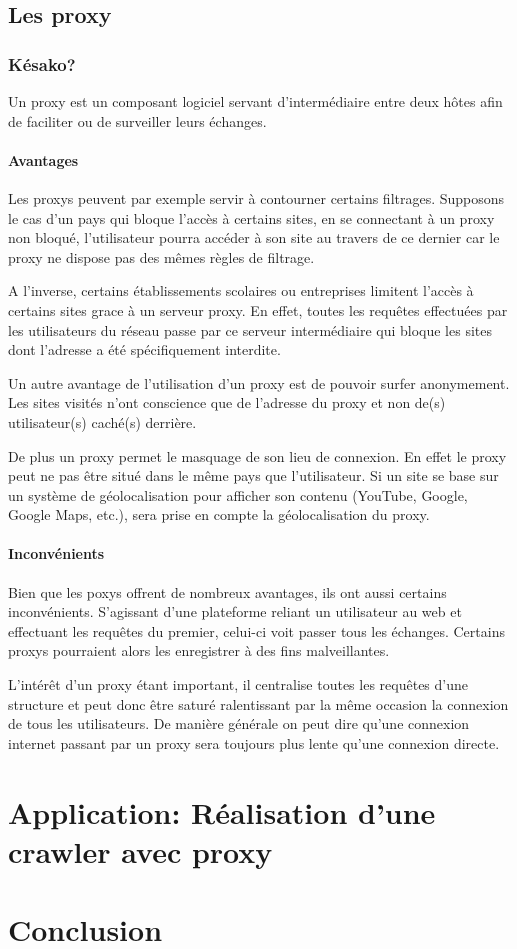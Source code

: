 \documentclass[hideweeklyreports,noposter]{polytech/polytech}
\begin{document}
	\chapter{Les proxy}
		\section{Késako?}
			Un proxy est un composant logiciel servant d'intermédiaire entre deux hôtes afin de faciliter ou de surveiller leurs échanges.
			
			\subsection{Avantages}
				Les proxys peuvent par exemple servir à contourner certains filtrages.
				Supposons le cas d'un pays qui bloque l'accès à certains sites, en se connectant à un proxy non bloqué, l'utilisateur pourra accéder à son site au travers de ce dernier car le proxy ne dispose pas des mêmes règles de filtrage.
				
				A l'inverse, certains établissements scolaires ou entreprises limitent l'accès à certains sites grace à un serveur proxy. En effet, toutes les requêtes effectuées par les utilisateurs du réseau passe par ce serveur intermédiaire qui bloque les sites dont l'adresse a été spécifiquement interdite.
				
				Un autre avantage de l'utilisation d'un proxy est de pouvoir surfer anonymement. Les sites visités n'ont conscience que de l'adresse du proxy et non de(s) utilisateur(s) caché(s) derrière.
				
				De plus un proxy permet le masquage de son lieu de connexion. En effet le proxy peut ne pas être situé dans le même pays que l'utilisateur.
				Si un site se base sur un système de géolocalisation pour afficher son contenu (YouTube, Google, Google Maps, etc.), sera prise en compte la géolocalisation du proxy.
				
			\subsection{Inconvénients}
				Bien que les poxys offrent de nombreux avantages, ils ont aussi certains inconvénients.
				S'agissant d'une plateforme reliant un utilisateur au web et effectuant les requêtes du premier, celui-ci voit passer tous les échanges.
				Certains proxys pourraient alors les enregistrer à des fins malveillantes.
				
				L'intérêt d'un proxy étant important, il centralise toutes les requêtes d'une structure et peut donc être saturé ralentissant par la même occasion la connexion de tous les utilisateurs.
				De manière générale on peut dire qu'une connexion internet passant par un proxy sera toujours plus lente qu'une connexion directe.
		
\part{Application: Réalisation d'une crawler avec proxy}
\part{Conclusion}

\appendix		
\end{document}
